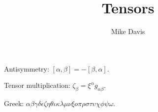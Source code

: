 \documentclass[12pt]{article}
\begin{document}
\title{Tensors}
\author{Mike Davis}
\maketitle



Antisymmetry: $[\alpha,\beta] = - [\beta,\alpha]$.

Tensor multiplication: $\zeta_{\beta} = \xi^{\alpha} g_{\alpha\beta}$.

Greek:
$\alpha\beta\gamma\delta\epsilon\zeta\eta\theta\iota\kappa\lambda\mu
\nu\xi{o}\pi\rho\sigma\tau\upsilon\chi\phi\psi\omega$.
\end{document}
